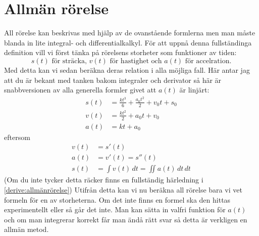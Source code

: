 \section{Allmän rörelse}
All rörelse kan beskrivas med hjälp av de ovanstående formlerna men man måste blanda in lite integral- och differentialkalkyl. För att uppnå denna fullständinga definition vill vi först tänka på rörelsens storheter som funktioner av tiden:
\begin{equation*}
    s(t) \text{ för sträcka, } v(t) \text{ för hastighet och } a(t) \text{ för accelration.}
\end{equation*}
Med detta kan vi sedan beräkna deras relation i alla möjliga fall. Här antar jag att du är bekant med tanken bakom integraler och derivator så här är snabbversionen av alla generella formler givet att $a(t)$ är linjärt:
\begin{align*}
    s(t) &= \frac{kt^3}{6} + \frac{a_0t^2}{2} + v_0t + s_0 \\
    v(t) &= \frac{kt^2}{2} + a_0t + v_0 \\
    a(t) &= kt + a_0
\end{align*}
eftersom
\begin{align*}
    v(t) &= s'(t) \\
    a(t) &= v'(t) = s''(t) \\
    s(t) &= \int{v(t)}\, dt = \iint{a(t)}\, dt\, dt
\end{align*}
(Om du inte tycker detta räcker finns en fullständig härledning i \vref{derive:allmänrörelse}) Utifrån detta kan vi nu beräkna all rörelse bara vi vet formeln för en av storheterna. Om det inte finns en formel ska den hittas experimentellt eller så går det inte. Man kan sätta in valfri funktion för $a(t)$ och om man integrerar korrekt får man ändå rätt svar så detta är verkligen en allmän metod.